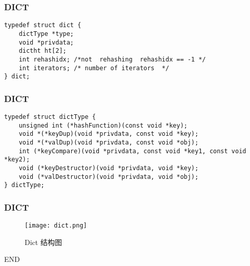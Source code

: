 \documentclass{beamer}
\begin{document}
\begin{CJK*}{UTF8}{gkai}
\begin{frame}[fragile]
\frametitle{DICT}
\begin{verbatim}
typedef struct dict {
    dictType *type;
    void *privdata;
    dictht ht[2];
    int rehashidx; /*not  rehashing  rehashidx == -1 */
    int iterators; /* number of iterators  */
} dict;
\end{verbatim}
\end{frame}

\begin{frame}[fragile]
\frametitle{DICT}
\begin{verbatim}
typedef struct dictType {
    unsigned int (*hashFunction)(const void *key);
    void *(*keyDup)(void *privdata, const void *key);
    void *(*valDup)(void *privdata, const void *obj);
    int (*keyCompare)(void *privdata, const void *key1, const void *key2);
    void (*keyDestructor)(void *privdata, void *key);
    void (*valDestructor)(void *privdata, void *obj);
} dictType;
\end{verbatim}
\end{frame}

\begin{frame}
\frametitle{DICT}
\begin{figure}[ht!]
\centering
\texttt{[image: dict.png]}
\caption{Dict 结构图}
\label{overflow}
\end{figure}

\end{frame}


\begin{frame}
\begin{center}
 END
\end{center}
\end{frame}


\end{CJK*}
\end{document}
